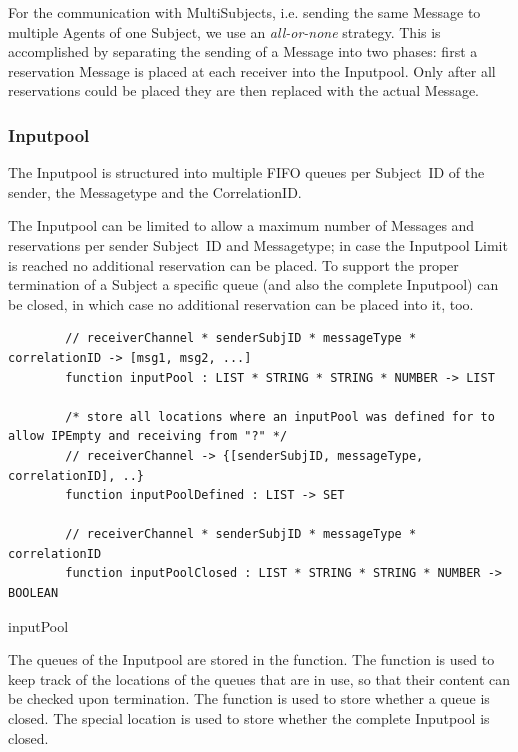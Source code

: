 For the communication with MultiSubjects, i.e. sending the same Message to
multiple Agents of one Subject, we use an \textit{all-or-none} strategy. This
is accomplished by separating the sending of a Message into two phases: first
a reservation Message is placed at each receiver into the Inputpool.
Only after all reservations could be placed they are then replaced with the
actual Message.

\subsubsection{Inputpool}\label{sec:Inputpool}

The Inputpool is structured into multiple FIFO queues per Subject~ID of the sender, the Messagetype and the CorrelationID.

The Inputpool can be limited to allow a maximum number of Messages and
reservations per sender Subject~ID and Messagetype; in case the Inputpool Limit is
reached no additional reservation can be placed. To support the proper
termination of a Subject a specific queue (and also the complete Inputpool)
can be closed, in which case no additional reservation can be placed into it,
too.

\begin{listing}[H]
	\begin{verbatim}
		// receiverChannel * senderSubjID * messageType * correlationID -> [msg1, msg2, ...]
		function inputPool : LIST * STRING * STRING * NUMBER -> LIST
		
		/* store all locations where an inputPool was defined for to allow IPEmpty and receiving from "?" */
		// receiverChannel -> {[senderSubjID, messageType, correlationID], ..}
		function inputPoolDefined : LIST -> SET
		
		// receiverChannel * senderSubjID * messageType * correlationID
		function inputPoolClosed : LIST * STRING * STRING * NUMBER -> BOOLEAN
	\end{verbatim}
	\caption{inputPool}
	\label{lst:shortasm:inputPool}
\end{listing}

The queues of the Inputpool are stored in the  function.
The function  is used to keep track of the
locations of the queues that are in use, so that their content can be checked
upon termination. The function  is used to store
whether a queue is closed. The special location
 is used to
store whether the complete Inputpool is closed.

